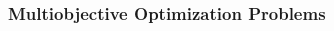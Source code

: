 \documentclass[aspectratio=169]{beamer}
\begin{document}
\begin{frame}\frametitle{Multiobjective Optimization Problems}
\begin{center}
\end{center}
\begin{columns}
\begin{column}{.35\textwidth}
\end{column}
\begin{column}{.2\textwidth}
\begin{center}
\end{center}
\end{column}
\begin{column}{.35\textwidth}
\end{column}
\end{columns}
\end{frame}
\end{document}

